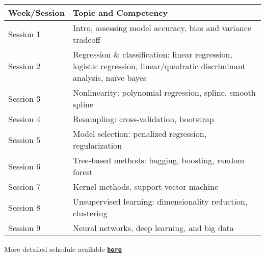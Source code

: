 \documentclass[11pt]{article}
\begin{document}
\begin{center}
\begin{tabular}{m{10em}|m{20em}}
Week/Session & Topic and Competency\\
\hline
Session 1 & Intro, assessing model accuracy, bias and variance tradeoff\\
\hline
Session 2 & Regression \& classification: linear regression, logistic 
regression, linear/quadratic discriminant analysis, naïve 
bayes\\
\hline
Session 3 & Nonlinearity: polynomial regression, spline, smooth spline\\
\hline
Session 4 & Resampling: cross-validation, bootstrap\\
\hline
Session 5 & Model selection: penalized regression, regularization\\\hline
Session 6 & Tree-based methods: bagging, boosting, random forest\\
\hline
Session 7 & Kernel methods, support vector machine\\
\hline
Session 8 & Unsupervised learning: dimensionality reduction, clustering\\
\hline
Session 9 & Neural networks, deep learning, and big data\\
\hline
\end{tabular}
\end{center}

More detailed schedule available \href{https://github.com/kmdono02/BIOS_635}{\tt\bf here}
\end{document}
